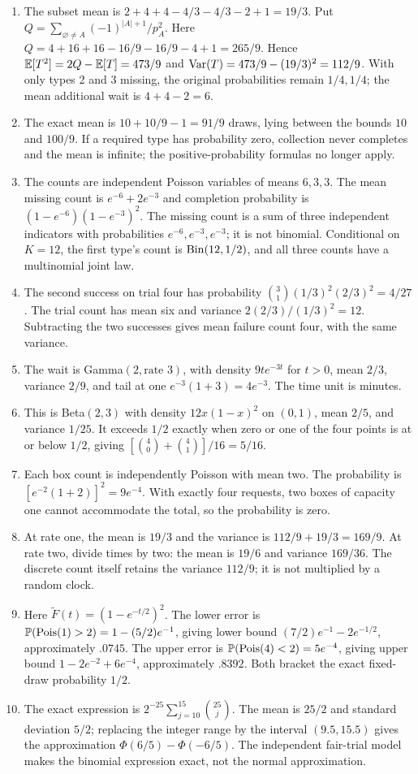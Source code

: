 \begin{enumerate}
 $\E[V]=1/2$ and $\E[V^2]=1/3$, so $\Var(V)=1/12$.
 Write $X=a+(b-a)V$ to obtain mean $(a+b)/2$ and variance $(b-a)^2/12$.
 \item The subset mean is
 $2+4+4-4/3-4/3-2+1=19/3$.
 Put $Q=\sum_{\varnothing\ne A}(-1)^{|A|+1}/p_A^2$.
 Here $Q=4+16+16-16/9-16/9-4+1=265/9$.
 Hence $\mathbb E[T^2]=2Q-\mathbb E[T]=473/9$ and
 $\operatorname{Var}(T)=473/9-(19/3)^2=112/9$.
 With only types 2 and 3 missing, the original probabilities remain
 $1/4,1/4$; the mean additional wait is $4+4-2=6$.
 \item The exact mean is $10+10/9-1=91/9$ draws, lying between
 the bounds $10$ and $100/9$. If a required type has probability zero,
 collection never completes and the mean is infinite; the positive-probability
 formulas no longer apply.
 \item The counts are independent Poisson variables of means $6,3,3$.
 The mean missing count is $e^{-6}+2e^{-3}$ and completion probability
 is $(1-e^{-6})(1-e^{-3})^2$. The missing count is a sum of three
 independent indicators with probabilities $e^{-6},e^{-3},e^{-3}$;
 it is not binomial. Conditional on $K=12$, the first type's count
 is $\operatorname{Bin}(12,1/2)$, and all three counts have a multinomial joint law.
 \item The second success on trial four has probability
 $\binom31(1/3)^2(2/3)^2=4/27$. The trial count has mean six and
 variance $2(2/3)/(1/3)^2=12$. Subtracting the two successes gives
 mean failure count four, with the same variance.
 \item The wait is Gamma$(2,\text{rate }3)$, with density
 $9te^{-3t}$ for $t>0$, mean $2/3$, variance $2/9$, and tail at one
 $e^{-3}(1+3)=4e^{-3}$. The time unit is minutes.
 \item This is Beta$(2,3)$ with density $12x(1-x)^2$ on $(0,1)$,
 mean $2/5$, and variance $1/25$. It exceeds $1/2$ exactly when
 zero or one of the four points is at or below $1/2$, giving
 $[\binom40+\binom41]/16=5/16$.
 \item Each box count is independently Poisson with mean two.
 The probability is $[e^{-2}(1+2)]^2=9e^{-4}$.
 With exactly four requests, two boxes of capacity one cannot
 accommodate the total, so the probability is zero.
 \item At rate one, the mean is $19/3$ and the variance is
 $112/9+19/3=169/9$. At rate two, divide times by two: the mean
 is $19/6$ and variance $169/36$. The discrete count itself retains
 the variance $112/9$; it is not multiplied by a random clock.
 \item Here $\widetilde F(t)=(1-e^{-t/2})^2$.
 The lower error is $\mathbb P(\operatorname{Pois}(1)>2)=1-(5/2)e^{-1}$, giving
 lower bound $(7/2)e^{-1}-2e^{-1/2}$, approximately $.0745$.
 The upper error is $\mathbb P(\operatorname{Pois}(4)<2)=5e^{-4}$, giving
 upper bound $1-2e^{-2}+6e^{-4}$, approximately $.8392$.
 Both bracket the exact fixed-draw probability $1/2$.
 \item The exact expression is
 $2^{-25}\sum_{j=10}^{15}\binom{25}j$.
 The mean is $25/2$ and standard deviation $5/2$; replacing the
 integer range by the interval $(9.5,15.5)$ gives the approximation
 $\Phi(6/5)-\Phi(-6/5)$. The independent fair-trial model makes the
 binomial expression exact, not the normal approximation.
\end{enumerate}

